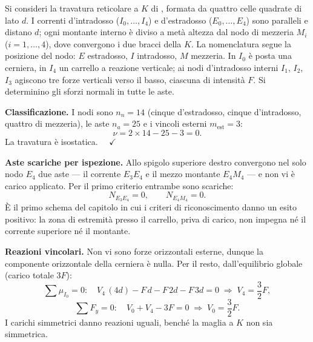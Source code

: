 \begin{esercizio}
	\label{ex:ktruss}
	
	Si consideri la travatura reticolare a $K$ di
	, formata da quattro celle
	quadrate di lato $d$. I correnti d'intradosso
	($I_0,\dots,I_4$) e d'estradosso ($E_0,\dots,E_4$) sono
	paralleli e distano $d$; ogni montante interno è diviso
	a metà altezza dal nodo di mezzeria $M_i$
	($i=1,\dots,4$), dove convergono i due bracci della $K$.
	La nomenclatura segue la posizione del nodo: $E$
	estradosso, $I$ intradosso, $M$ mezzeria. In $I_0$ è
	posta una cerniera, in $I_4$
	un carrello a reazione verticale; ai nodi d'intradosso
	interni $I_1$, $I_2$, $I_3$ agiscono tre forze
	verticali verso il basso, ciascuna di intensità $F$.
	Si determinino gli sforzi normali in tutte le aste.
	
	\begin{svolgimento}
		



		
		\noindent\textbf{Classificazione.}
		I nodi sono $n_n = 14$ (cinque d'estradosso, cinque
		d'intradosso, quattro di mezzeria), le aste
		$n_a = 25$ e i vincoli esterni $m_\text{est} = 3$:
		\[
		\nu = 2\times 14 - 25 - 3 = 0.
		\]
		La travatura è isostatica. $\quad\checkmark$
		
		\noindent\textbf{Aste scariche per ispezione.}
		Allo spigolo superiore destro convergono nel solo
		nodo $E_4$ due aste --- il corrente $E_3E_4$ e il
		mezzo montante $E_4M_4$ --- e non vi è carico
		applicato. Per il primo criterio entrambe sono
		scariche:
		\[
		N_{E_3E_4} = 0, \qquad N_{E_4M_4} = 0.
		\]
		È il primo schema del capitolo in cui i criteri di
		riconoscimento danno un esito positivo: la zona di
		estremità presso il carrello, priva di carico, non
		impegna né il corrente superiore né il montante.
		
		\noindent\textbf{Reazioni vincolari.}
		Non vi sono forze orizzontali esterne, dunque la
		componente orizzontale della cerniera è nulla. Per
		il resto, dall'equilibrio globale (carico totale
		$3F$):
		\[
		\sum \mu_{I_0} = 0:\quad
		V_4\,(4d) - F\,d - F\,2d - F\,3d = 0
		\;\Rightarrow\;
		V_4 = \frac{3}{2}F,
		\]
		\[
		\sum F_y = 0:\quad
		V_0 + V_4 - 3F = 0
		\;\Rightarrow\;
		V_0 = \frac{3}{2}F.
		\]
		I carichi simmetrici danno reazioni uguali, benché
		la maglia a $K$ non sia simmetrica.
		

\end{svolgimento}
\end{esercizio}

